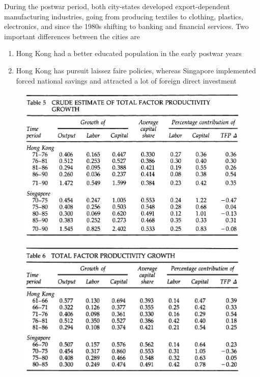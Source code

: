\documentclass{beamer}
\begin{document}
\begin{frame}
  During the postwar period, both city-states developed export-dependent manufacturing industries, going from producing textiles to clothing, plastics, electronics, and since the 1980s shifting to banking and financial services.
  Two important differences between the cities are
\begin{enumerate}
  \item Hong Kong had a better educated population in the early postwar years
  \item Hong Kong has pursuit laissez faire policies, whereas Singapore implemented forced national savings and attracted a lot of foreign direct investment
\end{enumerate}
\end{frame}

\begin{frame}
  \begin{figure}
    \includegraphics[scale=.8]{young.eps}
  \end{figure}
\end{frame}

\begin{frame}
  \begin{figure}
    \includegraphics[scale=.8]{young2.eps}
  \end{figure}
\end{frame}
\end{document}
